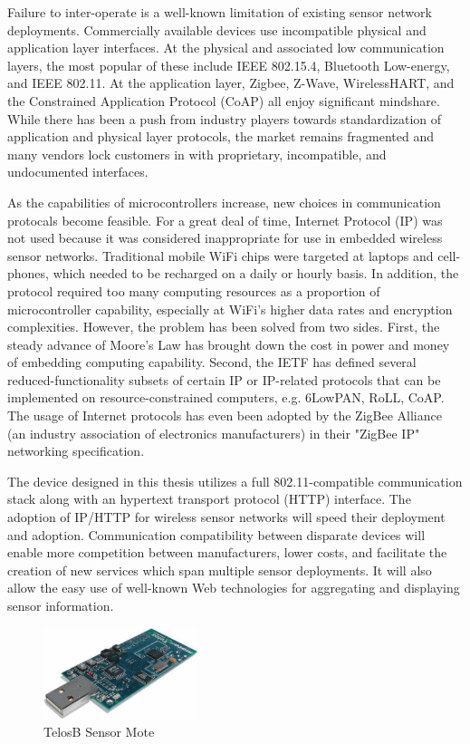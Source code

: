 Failure to inter-operate is a well-known limitation of existing sensor network deployments. Commercially available devices use incompatible physical and application layer interfaces. At the physical and associated low communication layers, the most popular of these include IEEE 802.15.4, Bluetooth Low-energy, and IEEE 802.11. At the application layer, Zigbee, Z-Wave, WirelessHART, and the Constrained Application Protocol (CoAP) all enjoy significant mindshare. While there has been a push from industry players towards standardization of application and physical layer protocols, the market remains fragmented and many vendors lock customers in with proprietary, incompatible, and undocumented interfaces.

As the capabilities of microcontrollers increase, new choices in communication protocals become feasible. For a great deal of time, Internet Protocol (IP) was not used because it was considered inappropriate for use in embedded wireless sensor networks. Traditional mobile WiFi chips were targeted at laptops and cell-phones, which needed to be recharged on a daily or hourly basis. In addition, the protocol required too many computing resources as a proportion of microcontroller capability, especially at WiFi's higher data rates and encryption complexities. However, the problem has been solved from two sides. First, the steady advance of Moore's Law has brought down the cost in power and money of embedding computing capability. Second, the IETF has defined several reduced-functionality subsets of certain IP or IP-related protocols that can be implemented on resource-constrained computers, e.g. 6LowPAN\cite{Montenegro2007}, RoLL\cite{Winter2012}, CoAP\cite{Z.Shelby2014}. The usage of Internet protocols has even been adopted by the ZigBee Alliance (an industry association of electronics manufacturers) in their "ZigBee IP" networking specification.

The device designed in this thesis utilizes a full 802.11-compatible communication stack along with an  hypertext transport protocol (HTTP) interface. The adoption of IP/HTTP for wireless sensor networks will speed their deployment and adoption. Communication compatibility between disparate devices will enable more competition between manufacturers, lower costs, and facilitate the creation of new services which span multiple sensor deployments. It will also allow the easy use of well-known Web technologies for aggregating and displaying sensor information.

\begin{figure}[h]
\includegraphics[width=0.4\textwidth]{images/telosb}
\caption{TelosB Sensor Mote\cite{Polastre2005}}
\label{telosB}
\end{figure}

